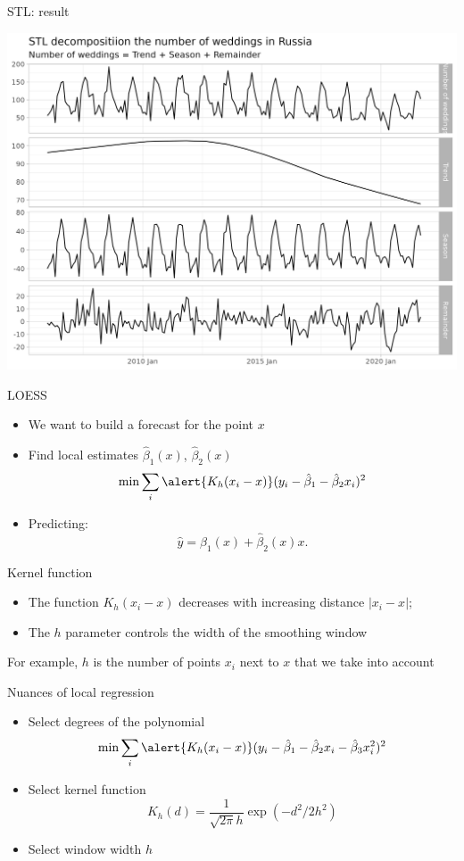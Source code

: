 \begin{frame}{STL: result}
	
	\includegraphics[width=\textwidth]{pictures/om_ts_01-074.png}
	
	
\end{frame}

\begin{frame}{LOESS}
	
	\begin{itemize}
		\item We want to build a forecast for the point $x$
		\item Find \alert{local estimates} $\hat\beta_1(x)$, $\hat\beta_2(x)$
		\[
		\min \sum_i \alert{K_h(x_i - x)} (y_i - \hat\beta_1 - \hat\beta_2 x_i)^2
		\]
		\item Predicting:
		\[
		\hat y = \hat\beta_1(x) + \hat\beta_2(x) x.
		\]
	\end{itemize}
	
	\pause
	\alert{Kernel function}
	\begin{itemize}
		\item The function $K_h(x_i - x)$ decreases with increasing distance $|x_i - x|$;
		\item The $h$ parameter controls the width of the smoothing window
	\end{itemize}
	
	\pause
	For example, $h$ is the number of points $x_i$ next to $x$ that we take into account
	
\end{frame}

\begin{frame}{Nuances of local regression}
	
	\begin{itemize}
		\item Select \alert{degrees of the polynomial}
		\[
		\min \sum_i \alert{K_h(x_i - x)} (y_i - \hat\beta_1 - \hat\beta_2 x_i - \hat\beta_3 x_i^2)^2
		\]
		\item Select \alert{kernel} function
		\[
		K_h(d) = \frac{1}{\sqrt{2\pi}h} \exp(- d^2/2h^2)
		\]
		\item Select \alert{window width} $h$
		
	\end{itemize}
	
\end{frame}

